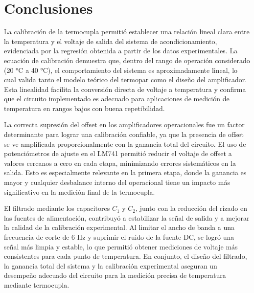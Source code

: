 \section*{Conclusiones}


La calibración de la termocupla permitió establecer una relación lineal clara entre la temperatura y el voltaje de salida del sistema de acondicionamiento, evidenciada por la regresión obtenida a partir de los datos experimentales. La ecuación de calibración demuestra que, dentro del rango de operación considerado (20 °C a 40 °C), el comportamiento del sistema es aproximadamente lineal, lo cual valida tanto el modelo teórico del termopar como el diseño del amplificador. Esta linealidad facilita la conversión directa de voltaje a temperatura y confirma que el circuito implementado es adecuado para aplicaciones de medición de temperatura en rangos bajos con buena repetibilidad.

La correcta supresión del offset en los amplificadores operacionales fue un factor determinante para lograr una calibración confiable, ya que la presencia de offset se ve amplificada proporcionalmente con la ganancia total del circuito. El uso de potenciómetros de ajuste en el LM741 permitió reducir el voltaje de offset a valores cercanos a cero en cada etapa, minimizando errores sistemáticos en la salida. Esto es especialmente relevante en la primera etapa, donde la ganancia es mayor y cualquier desbalance interno del operacional tiene un impacto más significativo en la medición final de la termocupla.

El filtrado mediante los capacitores $C_1$ y $C_2$, junto con la reducción del rizado en las fuentes de alimentación, contribuyó a estabilizar la señal de salida y a mejorar la calidad de la calibración experimental. Al limitar el ancho de banda a una frecuencia de corte de 6 Hz y suprimir el ruido de la fuente DC, se logró una señal más limpia y estable, lo que permitió obtener mediciones de voltaje más consistentes para cada punto de temperatura. En conjunto, el diseño del filtrado, la ganancia total del sistema y la calibración experimental aseguran un desempeño adecuado del circuito para la medición precisa de temperatura mediante termocupla.
